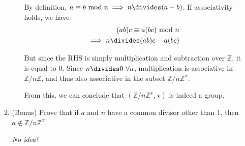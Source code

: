 \documentclass{scrartcl}
\begin{document}
\begin{enumerate}
\begin{enumerate}
\begin{enumerate}
				By definition, $a \equiv b\ \textrm{mod n} \implies n \divides (a-b)$.
				If associativity holds, we have
				\begin{align*}
					(ab)c \equiv a(bc)\ \textrm{mod}\ n \\
					\implies n \divides (ab)c - a(bc) \\
				\end{align*}
				
				But since the RHS is simply multiplication and subtraction over $\mathbb{Z}$, it is equal to $0$. Since $n \divides 0\ \forall n$, multiplication is associative in $\mathbb{Z} /n \mathbb{Z}$, and thus also associative in the subset $\mathbb{Z} /n \mathbb{Z}^x$. 
				
				From this, we can conclude that $(\mathbb{Z} /n \mathbb{Z}^x,\star)$  is indeed a group.
			\end{enumerate}
		
		\item (Bonus) Prove that if $a$ and $n$ have a common divisor other than 1, then $a \not\in \mathbb{Z} /n \mathbb{Z}^x$.
		
		\textit{No idea!}
		
	\end{enumerate}
	
\end{enumerate}
\end{document}
